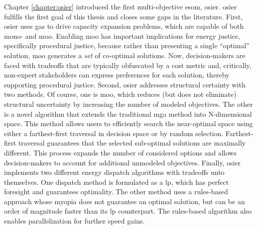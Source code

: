Chapter \ref{chapter:osier} introduced the first multi-objective \ac{esom},
\ac{osier}. \ac{osier} fulfills the first goal of this thesis and closes some
gaps in the literature. First, \ac{osier} uses \acfp{ga} to drive capacity
expansion problems, which are capable of both mono- and \acl{moo}. Enabling
\ac{moo} has important implications for energy justice, specifically procedural
justice, because rather than presenting a single ``optimal'' solution, \ac{moo}
generates a \textit{set} of co-optimal solutions. Now, decision-makers are faced
with tradeoffs that are typically obfuscated by a cost metric and, critically,
non-expert stakeholders can express preferences for each solution, thereby
supporting procedural justice. Second, \ac{osier} addresses structural certainty
with two methods. Of course, one is \ac{moo}, which reduces (but does not
eliminate) structural uncertainty by increasing the number of modeled
objectives. The other is a novel algorithm that extends the traditional \ac{mga}
method into N-dimensional space. This method allows users to efficiently search
the near-optimal space using either a farthest-first traversal in decision space
or by random selection. Farthest-first traversal guarantees that the selected
sub-optimal solutions are maximally different. This process expands the number
of considered options and allows decision-makers to account for additional
unmodeled objectives. Finally, \ac{osier} implements two different energy
dispatch algorithms with tradeoffs unto themselves. One dispatch method is
formulated as a \acf{lp}, which has perfect foresight and guarantees optimality.
The other method uses a rules-based approach whose myopia does not guarantee an
optimal solution, but can be an order of magnitude faster than its \ac{lp}
counterpart. The rules-based algorithm also enables parallelization for further
speed gains.


